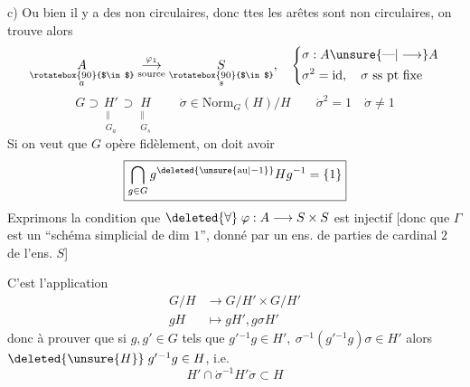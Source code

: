 c) Ou bien il y a des  non circulaires, donc ttes les arêtes sont non circulaires, on trouve alors
\[
 \underset{\substack{\rotatebox{90}{$\in$}\\a}}{A}
 \mathrel{\mathop{\longrightarrow}^{\varphi_1}_{\text{source}}}
 \underset{\substack{\rotatebox{90}{$\in$}\\s}}{S},\quad
 \left\{\begin{aligned}
 &\sigma:A\unsure{\text{---}|\longrightarrow}A\\
 &\sigma^2=\mathrm{id},\quad\sigma\ \text{ss pt fixe}
 \end{aligned}\right.
\]
\[
 \boxed{G\supset\underset{\substack{\parallel\\G_a}}{H'}\supset
 \underset{\substack{\parallel\\G_s}}H\qquad
 \dot\sigma\in\mathrm{Norm}_G(H)/H\qquad\dot\sigma^2=1\quad\dot\sigma\ne1}
\]
Si on veut que $G$ opère fidèlement, on  doit avoir
\[
 \boxed{\bigcap_{g\in G}g^{\deleted{\unsure{\mathrm{au}|-1}}}Hg^{-1}=\{1\}}
\]
Exprimons la condition que $\deleted{\forall}\;\varphi:A\longrightarrow S\times S$ est injectif [donc que $\Gamma$ est un ``schéma simplicial de dim $1$'', donné par un ens. de parties de cardinal $2$ de l'ens. $S$]

C'est l'application
\[
 \begin{aligned}
 G/H&\longrightarrow G/H'\times G/H'\\
 gH&\longmapsto gH',g\sigma H'
 \end{aligned}
\]
donc à prouver que si $g,g'\in G$ tels que $g'{}^{-1}g\in H',\ \sigma^{-1}(g'{}^{-1}g)\sigma\in H'$ alors $\deleted{\unsure{H}}\;g'{}^{-1}g\in H$, i.e.
\[
 \boxed{H'\cap\dot\sigma^{-1}H'\dot\sigma\subset H}
\]
